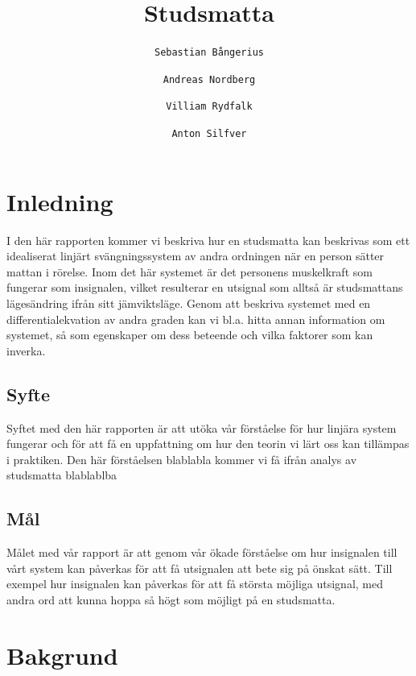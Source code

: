 \documentclass[10pt,a4paper]{article}
\author{
  \texttt{Sebastian Bångerius}
  \and
  \texttt{Andreas Nordberg}
  \and
  \texttt{Villiam Rydfalk}
  \and
  \texttt{Anton Silfver}
}
\begin{document}

\title{Studsmatta}
\maketitle

\cleardoublepage

\tableofcontents

\clearpage

\section{Inledning}
\setcounter{page}{3}

I den här rapporten kommer vi beskriva hur en studsmatta kan beskrivas som ett idealiserat linjärt svängningssystem av andra ordningen när en person sätter mattan i rörelse. Inom det här systemet är det personens muskelkraft som fungerar som insignalen, vilket resulterar en utsignal som alltså är studsmattans lägesändring ifrån sitt jämviktsläge. Genom att beskriva systemet med en differentialekvation av andra graden kan vi bl.a. hitta annan information om systemet, så som egenskaper om dess beteende och vilka faktorer som kan inverka.

\subsection{Syfte}
Syftet med den här rapporten är att utöka vår förståelse för hur linjära system fungerar och för att få en uppfattning om hur den teorin vi lärt oss kan tillämpas i praktiken. Den här förståelsen blablabla kommer vi få ifrån analys av studsmatta blablablba

\subsection{Mål}
Målet med vår rapport är att genom vår ökade förståelse om hur insignalen till vårt system kan påverkas för att få utsignalen att bete sig på önskat sätt. Till exempel hur insignalen kan påverkas för att få största möjliga utsignal, med andra ord att kunna hoppa så högt som möjligt på en studsmatta.



\section{Bakgrund}
\end{document}
